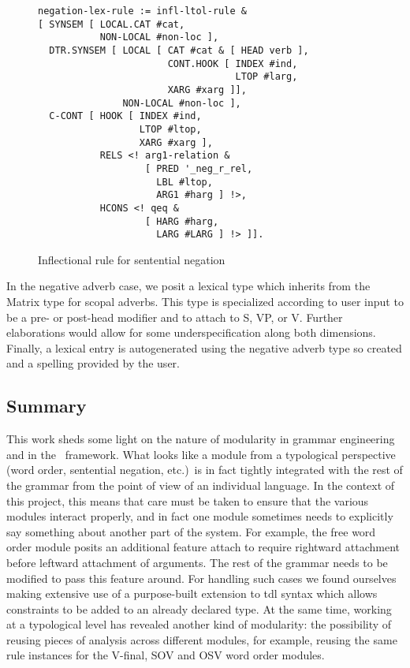 \begin{figure}[ht]
{\scriptsize
\begin{verbatim}
negation-lex-rule := infl-ltol-rule &
[ SYNSEM [ LOCAL.CAT #cat,
           NON-LOCAL #non-loc ],
  DTR.SYNSEM [ LOCAL [ CAT #cat & [ HEAD verb ],
                       CONT.HOOK [ INDEX #ind,
                                   LTOP #larg,
                       XARG #xarg ]],
               NON-LOCAL #non-loc ],
  C-CONT [ HOOK [ INDEX #ind,
                  LTOP #ltop,
                  XARG #xarg ],
           RELS <! arg1-relation &
                   [ PRED '_neg_r_rel,
                     LBL #ltop,
                     ARG1 #harg ] !>,
           HCONS <! qeq &
                   [ HARG #harg,
                     LARG #LARG ] !> ]].
\end{verbatim}
}
\caption{Inflectional rule for sentential negation}
\label{negrulefig}
\end{figure}

In the negative adverb case, we posit a lexical type which inherits
from the Matrix type for scopal adverbs.  This type is specialized
according to user input to be a pre- or post-head modifier and to
attach to S, VP, or V.  Further elaborations would allow for some
underspecification along both dimensions.  Finally, a lexical entry is
autogenerated using the negative adverb type so created and a spelling
provided by the user.

\subsection{Summary}

This work sheds some light on the nature of modularity in grammar
engineering and in the \hpsg\ framework.  What looks like a module from
a typological perspective (word order, sentential negation, etc.)\ is
in fact tightly integrated with the rest of the grammar from the point
of view of an individual language.  In the context of this project,
this means that care must be taken to ensure that the various modules
interact properly, and in fact one module sometimes needs to explicitly say
something about another part of the system.  For example, the free
word order module posits an additional feature {\sc attach} to require
rightward attachment before leftward attachment of arguments.  The
rest of the grammar needs to be modified to pass this feature around.
For handling such cases we found ourselves making extensive use of a
purpose-built extension to tdl syntax which allows constraints to be
added to an already declared type.  At the same time, working at a
typological level has revealed another kind of modularity: the
possibility of reusing pieces of analysis across different modules,
for example, reusing the same rule instances for the V-final, SOV and
OSV word order modules.


